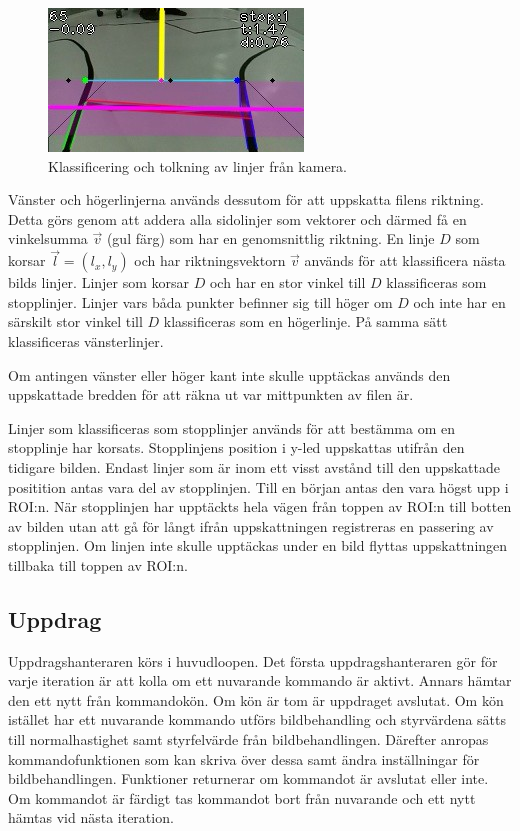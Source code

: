 \documentclass[tekniskrapport/tech.tex]{subfiles}
\begin{document}
\begin{figure}
    \includegraphics[width=\linewidth]{tekniskrapport/figures/opencv.jpg}
    \caption{Klassificering och tolkning av linjer från kamera.}
\end{figure}

Vänster och högerlinjerna används dessutom för att uppskatta filens riktning.
Detta görs genom att addera alla sidolinjer som vektorer och därmed få en
vinkelsumma $\vec{v}$ (gul färg) som har en genomsnittlig riktning. En linje
$D$ som korsar $\vec{l}=(l_x, l_y)$ och har riktningsvektorn $\vec{v}$ används
för att klassificera nästa bilds linjer. Linjer som korsar $D$ och har en stor
vinkel till $D$ klassificeras som stopplinjer. Linjer vars båda punkter
befinner sig till höger om $D$ och inte har en särskilt stor vinkel till $D$
klassificeras som en högerlinje. På samma sätt klassificeras vänsterlinjer.

Om antingen vänster eller höger kant inte skulle upptäckas används den
uppskattade bredden för att räkna ut var mittpunkten av filen är.

Linjer som klassificeras som stopplinjer används för att bestämma om en
stopplinje har korsats. Stopplinjens position i y-led uppskattas utifrån den
tidigare bilden. Endast linjer som är inom ett visst avstånd till den
uppskattade positition antas vara del av stopplinjen. Till en början antas den
vara högst upp i ROI:n. När stopplinjen har upptäckts hela vägen från toppen av
ROI:n till botten av bilden utan att gå för långt ifrån uppskattningen
registreras en passering av stopplinjen. Om linjen inte skulle upptäckas under
en bild flyttas uppskattningen tillbaka till toppen av ROI:n.
  
\subsection{Uppdrag} \label{sec:comm-mission}
Uppdragshanteraren körs i huvudloopen. Det första uppdragshanteraren gör för
varje iteration är att kolla om ett nuvarande kommando är aktivt. Annars hämtar
den ett nytt från kommandokön. Om kön är tom är uppdraget avslutat. Om kön
istället har ett nuvarande kommando utförs bildbehandling och styrvärdena sätts
till normalhastighet samt styrfelvärde från bildbehandlingen. Därefter anropas
kommandofunktionen som kan skriva över dessa samt ändra inställningar för
bildbehandlingen. Funktioner returnerar om kommandot är avslutat eller inte. Om
kommandot är färdigt tas kommandot bort från nuvarande och ett nytt hämtas vid
nästa iteration.
\end{document}
